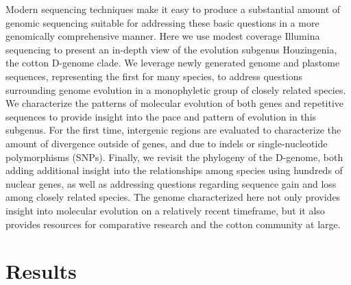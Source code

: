 \documentclass{bmcart}
\begin{document}
Modern sequencing techniques make it easy to produce a substantial amount of genomic sequencing suitable for addressing these basic questions in a more genomically comprehensive manner. Here we use modest coverage Illumina sequencing to present an in-depth view of the evolution subgenus Houzingenia, the cotton D-genome clade. We leverage newly generated genome and plastome sequences, representing the first for many species, to address questions surrounding genome evolution in a monophyletic group of closely related species. We characterize the patterns of molecular evolution of both genes and repetitive sequences to provide insight into the pace and pattern of evolution in this subgenus. For the first time, intergenic regions are evaluated to characterize the amount of divergence outside of genes, and due to indels or single-nucleotide polymorphisms (SNPs). Finally, we revisit the phylogeny of the D-genome, both adding additional insight into the relationships among species using hundreds of nuclear genes, as well as addressing questions regarding sequence gain and loss among closely related species. The genome characterized here not only provides insight into molecular evolution on a relatively recent timeframe, but it also provides resources for comparative research and the cotton community at large.


\section*{Results}
\end{document}
